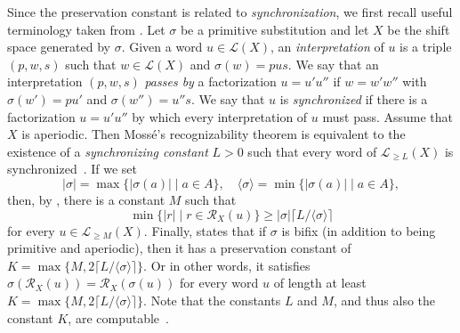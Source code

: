 \documentclass{amsart}
\newcommand*{\ret}{\mathcal{R}}
\newcommand*{\lang}{\mathcal{L}}
\theoremstyle{plain}
\theoremstyle{definition}
\theoremstyle{remark}
\begin{document}
Since the preservation constant is related to \emph{synchronization}, we first recall useful terminology taken from \cite{th/Kyriakoglou2019}. Let $\sigma$ be a primitive substitution and let $X$ be the shift space generated by $\sigma$. Given a word $u\in\lang(X)$, an \emph{interpretation} of $u$ is a triple $(p,w,s)$ such that $w\in\lang(X)$ and $\sigma(w) = pus$. We say that an interpretation $(p,w,s)$ \emph{passes by} a factorization $u = u'u''$ if $w = w'w''$ with $\sigma(w') = pu'$ and $\sigma(w'')=u''s$. We say that $u$ is \emph{synchronized} if there is a factorization $u= u'u''$ by which every interpretation of $u$ must pass. Assume that $X$ is aperiodic. Then Mossé's recognizability theorem \cite{Mosse1992} is equivalent to the existence of a \emph{synchronizing constant} $L>0$ such that every word of $\lang_{\geq L}(X)$ is synchronized~\cite[Proposition 3.3.20]{th/Kyriakoglou2019}. If we set
\begin{equation*}
    |\sigma| = \max\{|\sigma(a)| \mid a\in A\},\quad \langle\sigma\rangle =\min\{|\sigma(a)| \mid a\in A\},
\end{equation*}
then, by \cite[Lemma 3.2]{Durand1998}, there is a constant $M$ such that 
\begin{equation*}
    \min\{|r| \mid r\in \ret_X(u)\}\geq |\sigma| \lceil L/\langle\sigma\rangle\rceil
\end{equation*}
for every $u\in \lang_{\geq M}(X)$. Finally, \cite[Theorem~1]{Berthe2023} states that if $\sigma$ is bifix (in addition to being primitive and aperiodic), then it has a preservation constant of $K = \max\{M, 2\lceil L/\langle\sigma\rangle\rceil\}$. Or in other words, it satisfies $\sigma(\ret_X(u)) = \ret_X(\sigma(u))$ for every word $u$ of length at least $K = \max\{M, 2\lceil L/\langle\sigma\rangle\rceil\}$. Note that the constants $L$ and $M$, and thus also the constant $K$, are computable~\cite[Proposition~3]{Berthe2023}.
\end{document}
